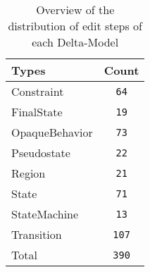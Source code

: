 \begin{table} 
 \center 
 \small 
\begin{tabular}{|l|c|}
\hline
Types & Count\\ 
  \hline 
Constraint & \texttt{64}\\ 
  \hline 
FinalState & \texttt{19}\\ 
  \hline 
OpaqueBehavior & \texttt{73}\\ 
  \hline 
Pseudostate & \texttt{22}\\ 
  \hline 
Region & \texttt{21}\\ 
  \hline 
State & \texttt{71}\\ 
  \hline 
StateMachine & \texttt{13}\\ 
  \hline 
Transition & \texttt{107}\\ 
  \hline 
Total & \texttt{390}\\ 
  \hline 
\end{tabular}
\caption[Overview: Delta-Models]{Overview of the distribution of edit steps of each Delta-Model}
\end{table}

